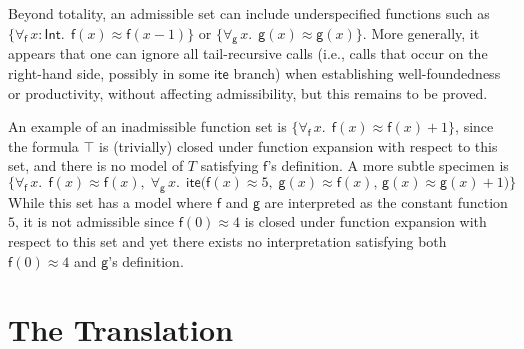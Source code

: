 \documentclass[runningheads,a4paper]{llncs}
\newcommand{\con}[1]{\mathsf{#1}}
\newcommand{\teq}{\approx}
\newcommand{\typeint}{\ty{Int}}
\newcommand\ty[1]{\con{#1}}
\newcommand{\ltrue}{\top}
\newcommand{\lite}{\con{ite}}
\newcommand{\forallf}[1]{\forall_{\!#1\:}}
\begin{document}
Beyond totality, an admissible set can include underspecified functions
such as $\{ \forallf{\con{f}} x : \typeint.\;\, \con{f}( x )
\teq \con{f}( x - 1 ) \}$ or $\{ \forallf{\con{g}} x.\allowbreak\;\, \con{g}( x
) \teq \con{g}( x ) \}$. More generally, it appears that one can ignore all
tail-recursive calls (i.e., calls that occur on the right-hand side, possibly
in some $\lite$ branch) when establishing well-foundedness or productivity,
without affecting admissibility, but this remains to be proved.

An example of an inadmissible function set is
$\{ \forallf{\con{f}} x.\;\, \con{f}( x ) \teq \con{f}( x ) + 1 \}$,
since the formula $\ltrue$ is (trivially) closed under function expansion with respect to this set,
and there is no model of $T$
satisfying $\con{f}$'s definition. A more subtle specimen is
\[\{ 
 \forallf{\con{f}} x.\;\, \con{f}( x ) \teq \con{f}( x ),\;
 \forallf{\con{g}} x.\;\, \lite\bigl( \con{f}( x ) \teq 5,\;
   \con{g}( x ) \teq \con{f}( x ),\,
   \con{g}( x ) \teq \con{g}( x ) + 1)
\}\]
While this set has a model where $\con f$ and $\con g$ are interpreted as the
constant function $5$, it is not admissible since %
$\con{f}( 0 ) \teq 4$ is
closed under function expansion with respect to this set and yet there exists
no interpretation satisfying both $\con{f}( 0 ) \teq 4$ and $\con{g}$'s
definition.


\section{The Translation}
\label{sec:encoding}

\newcommand{\itemx}{\itemindent5em\item}
\end{document}
